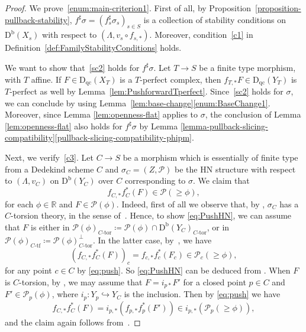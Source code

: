 \documentclass[11pt, reqno]{amsart}
\numberwithin{equation}{section}
\theoremstyle{plain}
\theoremstyle{remark}
\theoremstyle{definition}
\theoremstyle{italicsname}
\def\Ctor{{\ensuremath{C\text{-}\mathrm{tor}}}}
\def\Ctf{{\ensuremath{C\text{-}\mathrm{tf}}}}
\newcommand{\Db}{\mathrm{D^b}}
\newcommand{\Dqc}{\mathrm{D}_{\mathrm{qc}}}
\newcommand{\cP}{\mathscr{P}}
\def\RR{\ensuremath{\mathbb{R}}}
\begin{document}
\begin{proof}
We prove~\ref{enum:main-criterion1}. 
First of all, by Proposition~\ref{proposition-pullback-stability}, $f^{\sharp}{\sigma}=(f_s^{\sharp}\sigma_s)_{s\in S}$ is a collection of stability conditions on $\Db(X_s)$ with respect to $(\Lambda, v_s\circ f_{s,*})$.
Moreover, condition~\ref{c1} in Definition~\ref{def:FamilyStabilityConditions} holds.

We want to show that~\ref{sc2} holds for $f^\sharp{\sigma}$.
Let $T\to S$ be a finite type morphism, with $T$ affine.
If $F\in\Dqc(X_T)$ is a $T$-perfect complex, then $f_{T,*}F\in\Dqc(Y_T)$ is $T$-perfect as well by Lemma~\ref{lem:PushforwardTperfect}.
Since~\ref{sc2} holds for ${\sigma}$, we can conclude by using Lemma~\ref{lem:base-change}\ref{enum:BaseChange1}.
Moreover, since Lemma \ref{lem:openness-flat} applies to ${\sigma}$, the conclusion of Lemma \ref{lem:openness-flat} also holds for $f^{\sharp}{\sigma}$ by Lemma \ref{lemma-pullback-slicing-compatibility}\ref{pullback-slicing-compatibility-phipm}.

Next, we verify~\ref{c3}. 
Let $C\to S$ be a morphism which is essentially of finite type from a Dedekind scheme $C$ and $\sigma_C=(Z,\cP)$ be the HN structure with respect to $(\Lambda,v_C)$ on $\Db(Y_C)$ over $C$ corresponding to ${\sigma}$.
We claim that
\begin{equation}\label{eq:PushHN}
f_{C,*}f_C^*(F)\in\cP(\geq\phi),
\end{equation}
for each $\phi\in\RR$ and $F\in\cP(\phi)$. 
Indeed, first of all we observe that, by \cite[Corollary 20.10 and Proposition 17.6]{stability-families}, $\sigma_C$ has a $C$-torsion theory, in the sense of~\cite[Definition 17.4]{stability-families}.
Hence, to show \eqref{eq:PushHN}, we can assume that $F$ is either in $\cP(\phi)_{\Ctor}\coloneqq\cP(\phi)\cap\Db(Y_C)_{\Ctor}$, or in $\cP(\phi)_{\Ctf}\coloneqq\cP(\phi)_{\Ctor}^\perp$.
In the latter case, by~\cite[Lemma 13.12]{stability-families}, we have 
\[
(f_{C,*}f_C^*(F))_c=f_{c,*}f_c^*(F_c)\in \cP_c(\geq \phi),
\]
for any point $c\in C$ by \eqref{eq:push}. 
So \eqref{eq:PushHN} can be deduced from \cite[Lemma 15.6 and Lemma 13.12]{stability-families}.
When $F$ is $C$-torsion, by \cite[Lemma 6.11]{stability-families}, we may assume that $F=i_{p*}F'$ for a closed point $p\in C$ and $F'\in\cP_p(\phi)$, where $i_p \colon Y_p \hookrightarrow Y_C$ is the inclusion. 
Then by \eqref{eq:push} we have
\[
f_{C,*}f_C^*(F)=i_{p,*}(f_{p,*}f_p^*(F'))\in i_{p,*}(\cP_p(\geq \phi)), 
\]
and the claim again follows from~\cite[Lemma 15.6]{stability-families}.


\end{proof}
\end{document}
